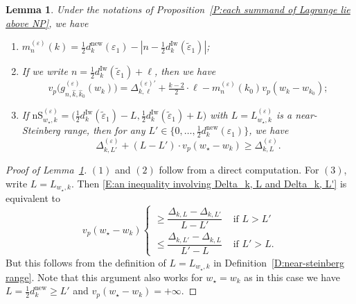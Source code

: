 \documentclass[12pt]{amsart}
\newtheorem{lemma}[subsection]{Lemma}
\theoremstyle{definition}
\numberwithin{equation}{subsection}
\newcommand{\new}{\mathrm{new}}
\newcommand{\Iw}{\mathrm{Iw}}
\newcommand{\nS}{\mathrm{nS}}
\begin{document}
\begin{lemma}\label{L:useful facts in the proof of Proposition each summand of Lagrange lie above NP}
	Under the notations of Proposition~\ref{P:each summand of Lagrange lie above NP}, we have
	\begin{enumerate}
		\item $m_n^{(\varepsilon)}(k)=\tfrac 12 d_k^\new(\varepsilon_1)-|n-\tfrac 12 d_k^\Iw(\tilde{\varepsilon}_1)|$;
		\item If we write $n=\tfrac 12 d_k^\Iw(\tilde{\varepsilon}_1)+\ell$, then we have 
		\[
		v_p\big(g_{n,\hat{k},\hat{k}_0}^{(\varepsilon)}(w_k)\big)=\Delta_{k,\ell}^{(\varepsilon)\prime}+\tfrac {k-2}2\cdot \ell-m_n^{(\varepsilon)}(k_0)v_p(w_k-w_{k_0});
		\]
\item If $\nS_{w_\star,k}^{(\varepsilon)}=\big(\tfrac 12 d_k^\Iw(\tilde{\varepsilon}_1)-L, \tfrac 12 d_k^\Iw(\tilde{\varepsilon}_1)+ L\big)$ with $L = L_{w_\star,k}^{(\varepsilon)}$ is a near-Steinberg range, then for any $L'\in \{0,\dots, \tfrac 12 d_k^\new(\varepsilon_1) \}$, we have 
	\begin{equation}\label{E:an inequality involving Delta_k, L and Delta_k, L'}
\Delta_{k,L'}^{(\varepsilon)}+(L-L')\cdot v_p(w_\star-w_k)\geq \Delta^{(\varepsilon)}_{k,L}.
		\end{equation}
	\end{enumerate}
\end{lemma}


\begin{proof}[Proof of Lemma~\ref{L:useful facts in the proof of Proposition each summand of Lagrange lie above NP}]
$(1)$ and $(2) $ follow from a direct computation. For $(3)$, write $L=L_{w_\star,k}$. 
Then \eqref{E:an inequality involving Delta_k, L and Delta_k, L'} is equivalent to
$$
v_p(w_\star -w_k) \begin{cases}
\geq \dfrac{\Delta_{k, L} - \Delta_{k,L'}}{L-L'} & \textrm{ if $L >L'$}\\
\leq \dfrac{\Delta_{k, L'} - \Delta_{k,L}}{L'-L} & \textrm{ if $L' >L$}.
\end{cases}
$$
But this follows from the definition of $L=L_{w_\star, k}$ in Definition~\ref{D:near-steinberg range}. Note that this argument also works for $w_\star=w_k$ as in this case we have $L=\tfrac 12 d_k^\new\geq L'$ and $v_p(w_\star-w_k)=+\infty$.
\end{proof}
\end{document}
